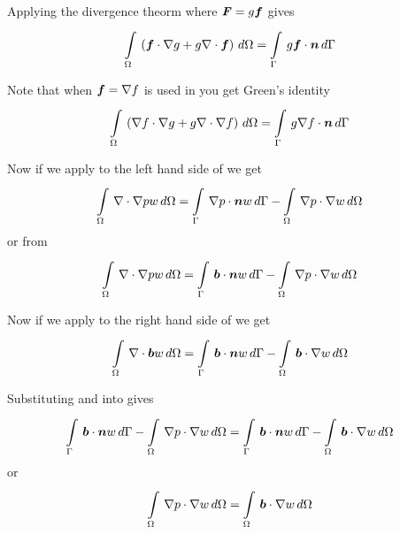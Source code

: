 Applying the divergence theorm where $\boldsymbol{\mathit{F}}=g\boldsymbol{f}$ gives
\begin{equation}
  \gint{\Omega}{}{\pbrac{\dotprod{\vectr{f}}{\gradient{}{g}}+g\divergence{}{\vectr{f}}}}{\Omega}=\gint{\Gamma}{}{g\dotprod{\vectr{f}}{\normal}}{\Gamma}
  \label{eqn:DivergenceTheormScalarVector}
\end{equation}

Note that when $\vectr{f}=\gradient{}{f}$ is used in
 you get Green's identity \ie
\begin{equation}
  \gint{\Omega}{}{\pbrac{\dotprod{\gradient{}{f}}{\gradient{}{g}}+g\divergence{}{\gradient{}{f}}}}{\Omega}=\gint{\Gamma}{}{g\dotprod{\gradient{}{f}}{\normal}}{\Gamma}
  \label{eqn:GreensIdentity1}
\end{equation}

Now if we apply  to the left hand side of
 we get
\begin{equation}
  \gint{\Omega}{}{\divergence{}{\gradient{}{p}}w}{\Omega}=\gint{\Gamma}{}{\dotprod{\gradient{}{p}}{\normal}w}{\Gamma}-
  \gint{\Omega}{}{\dotprod{\gradient{}{p}}{\gradient{}{w}}}{\Omega}
\end{equation}
or from 
\begin{equation}
  \gint{\Omega}{}{\divergence{}{\gradient{}{p}}w}{\Omega}=\gint{\Gamma}{}{\dotprod{\vectr{b}}{\normal}w}{\Gamma}-
  \gint{\Omega}{}{\dotprod{\gradient{}{p}}{\gradient{}{w}}}{\Omega}
  \label{eqn:PressurePoissonWeakFormLHS}
\end{equation}

Now if we apply  to the right hand
side of  we get
\begin{equation}
  \gint{\Omega}{}{\divergence{}{\vectr{b}}w}{\Omega}=\gint{\Gamma}{}{\dotprod{\vectr{b}}{\normal}w}{\Gamma}-
  \gint{\Omega}{}{\dotprod{\vectr{b}}{\gradient{}{w}}}{\Omega}
  \label{eqn:PressurePoissonWeakFormRHS}
\end{equation}

Substituting  and
 into
 gives
\begin{equation}
  \gint{\Gamma}{}{\dotprod{\vectr{b}}{\normal}w}{\Gamma}-
  \gint{\Omega}{}{\dotprod{\gradient{}{p}}{\gradient{}{w}}}{\Omega}=\gint{\Gamma}{}{\dotprod{\vectr{b}}{\normal}w}{\Gamma}-
  \gint{\Omega}{}{\dotprod{\vectr{b}}{\gradient{}{w}}}{\Omega}
\end{equation} 
or
\begin{equation}
  \gint{\Omega}{}{\dotprod{\gradient{}{p}}{\gradient{}{w}}}{\Omega}=\gint{\Omega}{}{\dotprod{\vectr{b}}{\gradient{}{w}}}{\Omega}
  \label{eqn:PressurePoissonFinalWeakForm}
\end{equation}


